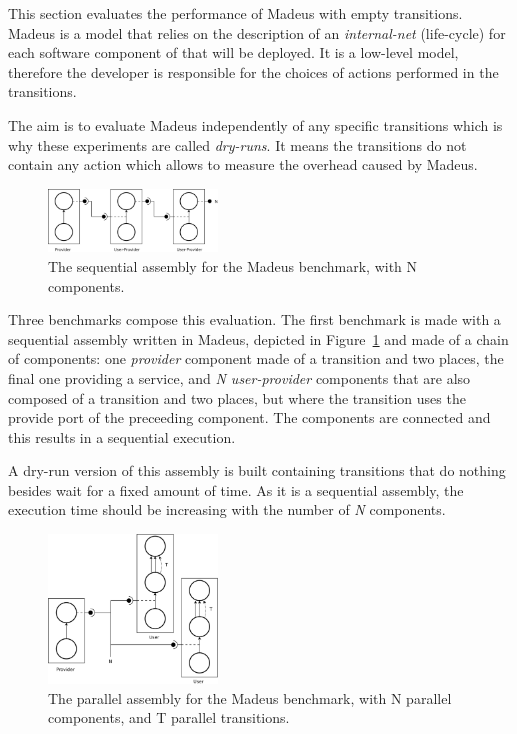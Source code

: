 This section evaluates the performance of Madeus with empty
transitions.  Madeus is a model that relies on the description of an
\emph{internal-net} (life-cycle) for each software component of that
will be deployed. It is a low-level model, therefore the developer is
responsible for the choices of actions performed in the transitions.

The aim is to evaluate Madeus independently of any specific
transitions which is why these experiments are called
\emph{dry-runs}. It means the transitions do not contain any action
which allows to measure the overhead caused by Madeus.


\begin{figure}[h]
  \begin{center}
    \includegraphics[width=0.4\textwidth]{./images/seq.pdf}
    \caption{The sequential assembly for the Madeus benchmark, with N components.}
    \label{fig:seq}
  \end{center}
\end{figure}

Three benchmarks compose this evaluation. The first benchmark is made
with a sequential assembly written in Madeus, depicted in
Figure~\ref{fig:seq} and made of a chain of components: one
\emph{provider} component made of a transition and two places, the
final one providing a service, and \emph{N user-provider} components
that are also composed of a transition and two places, but where the
transition uses the provide port of the preceeding component. The
components are connected and this results in a sequential execution.

A dry-run version of this assembly is built containing transitions
that do nothing besides wait for a fixed amount of time. As it is a
sequential assembly, the execution time should be increasing with the
number of \emph{N} components.

\begin{figure}[h]
  \begin{center}
    \includegraphics[width=0.4\textwidth]{./images/par.pdf}
    \caption{The parallel assembly for the Madeus benchmark, with N parallel components, and T parallel transitions.}
    \label{fig:par}
  \end{center}
\end{figure}

